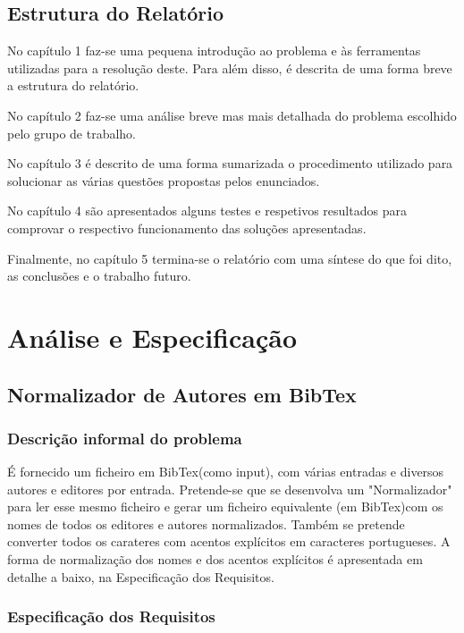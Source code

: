\documentclass{report}
\begin{document}
\section*{Estrutura do Relatório}
No capítulo 1 faz-se uma pequena introdução ao problema e às ferramentas 
utilizadas para a resolução deste. Para além disso, é descrita de uma 
forma breve a estrutura do relatório.\par
No capítulo 2 faz-se uma análise breve mas mais detalhada do problema 
escolhido pelo grupo de trabalho.\par
No capítulo 3 é descrito de uma forma sumarizada o procedimento utilizado 
para solucionar as várias questões propostas pelos enunciados.\par
No capítulo 4 são apresentados alguns testes e respetivos resultados 
para comprovar o respectivo funcionamento das soluções apresentadas.\par
Finalmente, no capítulo 5 termina-se o relatório com uma síntese do 
que foi dito, as conclusões e o trabalho futuro.

\chapter{Análise e Especificação} \label{ae}

\section{Normalizador de Autores em BibTex}

\subsection{Descrição informal do problema}
É fornecido um ficheiro em BibTex(como input), com várias entradas e 
diversos autores e editores por entrada.
Pretende-se que se desenvolva um "Normalizador" para ler esse mesmo 
ficheiro e gerar um ficheiro equivalente
(em BibTex)com os nomes de todos os editores e autores normalizados. 
Também se pretende converter todos os carateres com acentos explícitos 
em caracteres portugueses.
A forma de normalização dos nomes e dos acentos explícitos é apresentada 
em detalhe a baixo, na Especificação dos Requisitos.

\subsection{Especificação dos Requisitos}
\end{document}
